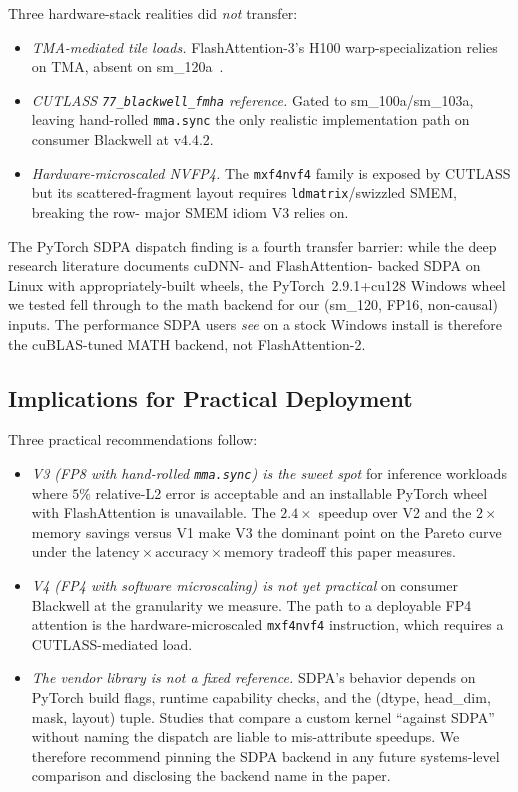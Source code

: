 \documentclass[conference]{IEEEtran}
\begin{document}
Three hardware-stack realities did \emph{not} transfer:
\begin{itemize}
  \item \emph{TMA-mediated tile loads.} FlashAttention-3's H100
        warp-specialization relies on TMA, absent on
        sm\_120a~\cite{nvidia2025blackwell}.
  \item \emph{CUTLASS \texttt{77\_blackwell\_fmha} reference.} Gated to
        sm\_100a/sm\_103a, leaving hand-rolled \texttt{mma.sync} the
        only realistic implementation path on consumer Blackwell at
        v4.4.2.
  \item \emph{Hardware-microscaled NVFP4.} The \texttt{mxf4nvf4} family
        is exposed by CUTLASS but its scattered-fragment layout
        requires \texttt{ldmatrix}/swizzled SMEM, breaking the row-
        major SMEM idiom V3 relies on.
\end{itemize}

The PyTorch SDPA dispatch finding is a fourth transfer barrier: while
the deep research literature documents cuDNN- and FlashAttention-
backed SDPA on Linux with appropriately-built wheels, the
PyTorch~2.9.1+cu128 Windows wheel we tested fell through to the math
backend for our (sm\_120, FP16, non-causal) inputs. The performance
SDPA users \emph{see} on a stock Windows install is therefore the
cuBLAS-tuned MATH backend, not FlashAttention-2.

\subsection{Implications for Practical Deployment}

Three practical recommendations follow:
\begin{itemize}
  \item \emph{V3 (FP8 with hand-rolled \texttt{mma.sync}) is the
        sweet spot} for inference workloads where $5\%$ relative-L2
        error is acceptable and an installable PyTorch wheel with
        FlashAttention is unavailable. The $2.4\times$ speedup over V2
        and the $2\times$ memory savings versus V1 make V3 the
        dominant point on the Pareto curve under the
        $\mathrm{latency} \times \mathrm{accuracy} \times
        \mathrm{memory}$ tradeoff this paper measures.
  \item \emph{V4 (FP4 with software microscaling) is not yet
        practical} on consumer Blackwell at the granularity we
        measure. The path to a deployable FP4 attention is the
        hardware-microscaled \texttt{mxf4nvf4} instruction, which
        requires a CUTLASS-mediated load.
  \item \emph{The vendor library is not a fixed reference.}
        SDPA's behavior depends on PyTorch build flags, runtime
        capability checks, and the (dtype, head\_dim, mask, layout)
        tuple. Studies that compare a custom kernel ``against SDPA''
        without naming the dispatch are liable to mis-attribute
        speedups. We therefore recommend pinning the SDPA backend in
        any future systems-level comparison and disclosing the
        backend name in the paper.
\end{itemize}
\end{document}
